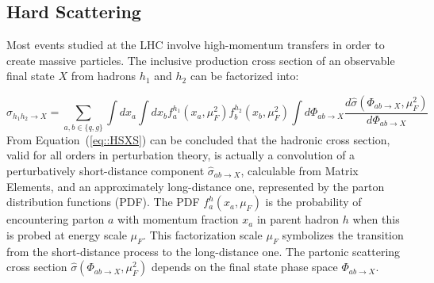 \subsection{Hard Scattering} \label{sec::HardScattering}
Most events studied at the LHC involve high-momentum transfers in order to create massive particles. The inclusive production cross section of an observable final state $X$ from hadrons $h_1$ and $h_2$ can be factorized into:

\begin{equation} \label{eq::HSXS}
 \sigma_{h_{1}h_{2} \rightarrow X} =\sum_{a,b \in \{q,g\} } \int dx_{a} \int dx_{b} f_{a}^{h_{1}}(x_{a},\mu^{2}_{F}) f_{b}^{h_{2}}(x_{b},\mu^{2}_{F}) \int d\Phi_{ab \rightarrow X} \dfrac{d\hat{\sigma}(\Phi_{ab \rightarrow X},\mu^{2}_{F})}{d\Phi_{ab \rightarrow X}}
\end{equation}
From Equation~(\ref{eq::HSXS}) can be concluded that the hadronic cross section, valid for all orders in perturbation theory, is actually a convolution of a perturbatively short-distance component $\hat{\sigma}_{ab \rightarrow X}$, calculable from Matrix Elements, and an approximately long-distance one, represented by the parton distribution functions (PDF). The PDF $f_{a}^{h}(x_{a},\mu_{F})$ is the probability of encountering parton $a$ with momentum fraction $x_a$ in parent hadron $h$ when this is probed at energy scale $\mu_{F}$. This factorization scale $\mu_{F}$ symbolizes the transition from the short-distance process to the long-distance one. 
The partonic scattering cross section $\hat{\sigma}(\Phi_{ab \rightarrow X},\mu^{2}_{F})$ depends on the final state phase space $\Phi_{ab \rightarrow X}$. 

